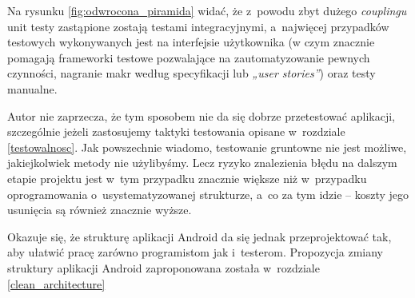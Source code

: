 \newpage
Na rysunku \ref{fig:odwrocona_piramida} widać, że z~powodu zbyt dużego \textit{couplingu} unit testy zastąpione zostają testami integracyjnymi, a~najwięcej przypadków testowych wykonywanych jest na interfejsie użytkownika (w czym znacznie pomagają frameworki testowe pozwalające na zautomatyzowanie pewnych czynności, nagranie makr według specyfikacji lub \textit{„user stories”}) oraz testy manualne.

Autor nie zaprzecza, że tym sposobem nie da się dobrze przetestować aplikacji, szczególnie jeżeli zastosujemy taktyki testowania opisane w~rozdziale \ref{testowalnosc}. Jak powszechnie wiadomo, testowanie gruntowne nie jest możliwe, jakiejkolwiek metody nie użylibyśmy. Lecz ryzyko znalezienia błędu na dalszym etapie projektu jest w~tym przypadku znacznie większe niż w~przypadku oprogramowania o~usystematyzowanej strukturze, a~co za tym idzie – koszty jego usunięcia są również znacznie wyższe.

Okazuje się, że strukturę aplikacji Android da się jednak przeprojektować tak, aby ułatwić pracę zarówno programistom jak i~testerom. Propozycja zmiany struktury aplikacji Android zaproponowana została w~rozdziale \ref{clean_architecture}

